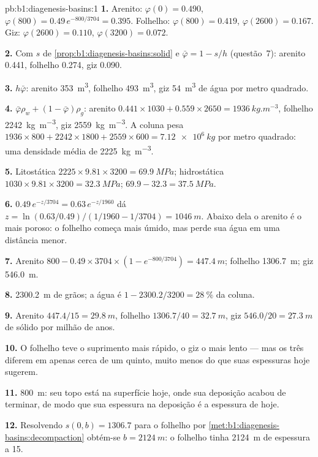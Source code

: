 \begin{solution}{pb:b1:diagenesis-basins:1}
\textbf{1.} Arenito: $\varphi(0) = \num{0.490}$, $\varphi(800) =
0.49\,e^{-800/3704} = \num{0.395}$. Folhelho: $\varphi(800) = \num{0.419}$,
$\varphi(2600) = \num{0.167}$. Giz: $\varphi(2600) = \num{0.110}$,
$\varphi(3200) = \num{0.072}$.

\textbf{2.} Com $s$ de \cref{prop:b1:diagenesis-basins:solid} e $\bar\varphi
= 1 - s/h$ (questão~7): arenito \num{0.441}, folhelho \num{0.274}, giz \num{0.090}.

\textbf{3.} $h\bar\varphi$: arenito \qty{353}{m^3}, folhelho \qty{493}{m^3}, giz
\qty{54}{m^3} de água por metro quadrado.

\textbf{4.} $\bar\varphi\rho_w + (1 - \bar\varphi)\rho_g$: arenito
$0.441\times1030 + 0.559\times2650 = \qty{1936}{kg.m^{-3}}$, folhelho
\qty{2242}{kg.m^{-3}}, giz \qty{2559}{kg.m^{-3}}. A coluna pesa
$1936\times800 + 2242\times1800 + 2559\times600 = \qty{7.12e6}{kg}$ por metro
quadrado: uma densidade média de \qty{2225}{kg.m^{-3}}.

\textbf{5.} Litostática $2225\times9.81\times3200 = \qty{69.9}{MPa}$; hidrostática
$1030\times9.81\times3200 = \qty{32.3}{MPa}$; 
$69.9 - 32.3 = \qty{37.5}{MPa}$.

\textbf{6.} $0.49\,e^{-z/3704} = 0.63\,e^{-z/1960}$ dá $z = \ln(0.63/0.49)
/(1/1960 - 1/3704) = \qty{1046}{m}$. Abaixo dela o arenito é o mais poroso: o folhelho
começa mais úmido, mas perde sua água em uma distância menor.

\textbf{7.} Arenito $800 - 0.49\times3704\times(1 - e^{-800/3704}) =
\qty{447.4}{m}$; folhelho \qty{1306.7}{m}; giz \qty{546.0}{m}.

\textbf{8.} \qty{2300.2}{m} de grãos; a água é $1 - 2300.2/3200 =
\qty{28}{\%}$ da coluna.

\textbf{9.} Arenito $447.4/15 = \qty{29.8}{m}$, folhelho $1306.7/40 =
\qty{32.7}{m}$, giz $546.0/20 = \qty{27.3}{m}$ de sólido por milhão de anos.

\textbf{10.} O folhelho teve o suprimento mais rápido, o giz o mais lento --- mas os três
diferem em apenas cerca de um quinto, muito menos do que suas espessuras hoje sugerem.

\textbf{11.} \qty{800}{m}: seu topo está na superfície hoje, onde sua deposição acabou de
terminar, de modo que sua espessura na deposição é a espessura de hoje.

\textbf{12.} Resolvendo $s(0, b) = 1306.7$ para o folhelho por
\cref{met:b1:diagenesis-basins:decompaction} obtém-se $b = \qty{2124}{m}$: o folhelho
tinha \qty{2124}{m} de espessura a \qty{15}{\Ma}.


\end{solution}
